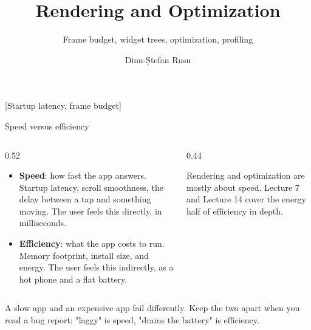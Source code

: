 \documentclass[10pt,aspectratio=169,t]{beamer}
\title{Rendering and Optimization}
\subtitle{Frame budget, widget trees, optimization, profiling}
\author{Dinu-Ștefan Rusu}
\begin{document}
\titleframe


[Startup latency, frame budget]

\begin{frame}[eyebrow=Performance]{Speed versus efficiency}
  \begin{columns}[T]
    \begin{column}{0.52\textwidth}
      \begin{itemize}
        \item \textbf{Speed}: how fast the app answers. Startup latency, scroll smoothness, the delay between a tap and something moving. The user feels this directly, in milliseconds.
        \item \textbf{Efficiency}: what the app costs to run. Memory footprint, install size, and energy. The user feels this indirectly, as a hot phone and a flat battery.
      \end{itemize}
    \end{column}
    \begin{column}{0.44\textwidth}
      \begin{hint}
        Rendering and optimization are mostly about speed. Lecture 7 and Lecture 14 cover the energy half of efficiency in depth.
      \end{hint}
    \end{column}
  \end{columns}
  \begin{takeaway}{A slow app and an expensive app fail differently.}
    Keep the two apart when you read a bug report: "laggy" is speed, "drains the battery" is efficiency.
  \end{takeaway}
\end{frame}
\end{document}
